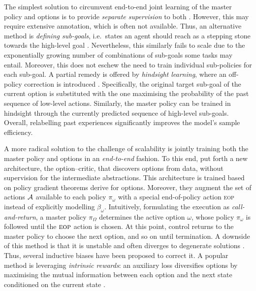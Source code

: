 \documentclass[10pt]{article} %
\begin{document}
The simplest solution to circumvent end-to-end joint learning of the master policy and options is to provide \textit{separate supervision} to both \citep{sutton1999between,dayan1992feudal}. However, this may require extensive annotation, which is often not available. Thus, an alternative method is \textit{defining sub-goals}, i.e.\ states an agent should reach as a stepping stone towards the high-level goal \cite{dietterich2000hierarchical}. Nevertheless, this similarly fails to scale due to the exponentially growing number of combinations of sub-goals some tasks may entail. Moreover, this does not eschew the need to train individual sub-policies for each sub-goal. A partial remedy is offered by \textit{hindsight learning}, where an off-policy correction is introduced \citep{nachum2018data}. Specifically, the original target sub-goal of the current option is substituted with the one maximising the probability of the past sequence of low-level actions. Similarly, the master policy can be trained in hindsight through the currently predicted sequence of high-level sub-goals. Overall, relabelling past experiences significantly improves the model's sample efficiency.

A more radical solution to the challenge of scalability is jointly training both the master policy and options in an \textit{end-to-end} fashion. To this end, 
\citet{bacon2017option} put forth a new architecture, the option--critic, that discovers options from data, without supervision for the intermediate abstractions. This architecture is trained based on policy gradient theorems \citet{bacon2017option} derive for options. Moreover, they augment the set of actions ${\mathcal{A}}$ available to each policy $\pi_\omega$ with a special end-of-policy action \textsc{eop} instead of explicitly modelling $\beta_\omega$.
Intuitively, 
formulating the execution as \textit{call-and-return}, a master policy $\pi_\Omega$ determines the active option $\omega$, whose policy $\pi_\omega$ is followed until the $\textsc{eop}$ action is chosen. At this point, control returns to the master policy to choose the next option, and so on until termination. A downside of this method is that it is unstable and often diverges to degenerate solutions \citep{jiang2019language}. Thus, several inductive biases have been proposed to correct it. A popular method is leveraging \textit{intrinsic rewards}: an auxiliary loss diversifies options by maximising the mutual information between each option and the next state conditioned on the current state \citep{florensa2017stochastic,kulkarni2016hierarchical}.
\end{document}
